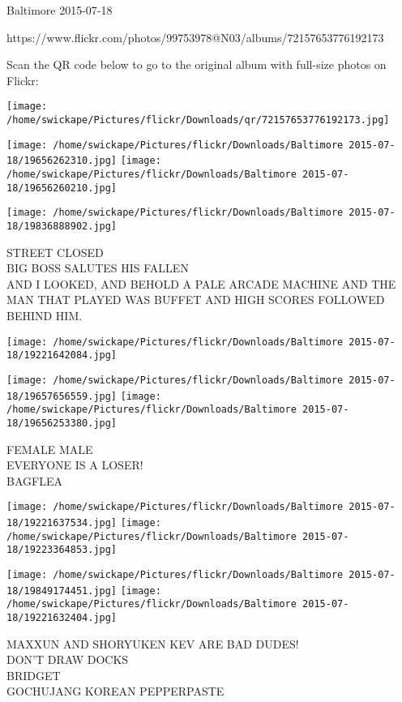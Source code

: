 \documentclass[10pt,letterpaper]{article}
\begin{document}
Baltimore 2015-07-18

https://www.flickr.com/photos/99753978@N03/albums/72157653776192173

Scan the QR code below to go to the original album with full-size photos on Flickr:

\texttt{[image: /home/swickape/Pictures/flickr/Downloads/qr/72157653776192173.jpg]}
\pagebreak

\texttt{[image: /home/swickape/Pictures/flickr/Downloads/Baltimore 2015-07-18/19656262310.jpg]}
\texttt{[image: /home/swickape/Pictures/flickr/Downloads/Baltimore 2015-07-18/19656260210.jpg]}

\vspace{0.25in}
\texttt{[image: /home/swickape/Pictures/flickr/Downloads/Baltimore 2015-07-18/19836888902.jpg]}

STREET CLOSED\\
BIG BOSS SALUTES HIS FALLEN\\
AND I LOOKED, AND BEHOLD A PALE ARCADE MACHINE AND THE MAN THAT PLAYED WAS BUFFET AND HIGH SCORES FOLLOWED BEHIND HIM.\\
\pagebreak

\texttt{[image: /home/swickape/Pictures/flickr/Downloads/Baltimore 2015-07-18/19221642084.jpg]}

\vspace{0.25in}
\texttt{[image: /home/swickape/Pictures/flickr/Downloads/Baltimore 2015-07-18/19657656559.jpg]}
\texttt{[image: /home/swickape/Pictures/flickr/Downloads/Baltimore 2015-07-18/19656253380.jpg]}

FEMALE MALE\\
EVERYONE IS A LOSER!\\
BAGFLEA\\
\pagebreak

\texttt{[image: /home/swickape/Pictures/flickr/Downloads/Baltimore 2015-07-18/19221637534.jpg]}
\texttt{[image: /home/swickape/Pictures/flickr/Downloads/Baltimore 2015-07-18/19223364853.jpg]}

\texttt{[image: /home/swickape/Pictures/flickr/Downloads/Baltimore 2015-07-18/19849174451.jpg]}
\texttt{[image: /home/swickape/Pictures/flickr/Downloads/Baltimore 2015-07-18/19221632404.jpg]}

MAXXUN AND SHORYUKEN KEV ARE BAD DUDES!\\
DON'T DRAW DOCKS\\
BRIDGET\\
GOCHUJANG KOREAN PEPPERPASTE\\
\pagebreak
\end{document}

